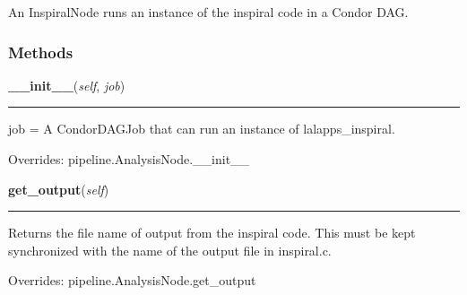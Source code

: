 An InspiralNode runs an instance of the inspiral code in a Condor DAG.



  \subsubsection{Methods}

    \label{inspiral:InspiralNode:__init__}
    \vspace{0.5ex}

    \noindent\begin{boxedminipage}{\textwidth}

    \raggedright \textbf{\_\_init\_\_}(\textit{self}, \textit{job})

    \vspace{-1.5ex}

    \rule{\textwidth}{0.5\fboxrule}
    job = A CondorDAGJob that can run an instance of lalapps\_inspiral.

    \vspace{1ex}

      Overrides: pipeline.AnalysisNode.\_\_init\_\_

    \end{boxedminipage}

    \label{inspiral:InspiralNode:get_output}
    \vspace{0.5ex}

    \noindent\begin{boxedminipage}{\textwidth}

    \raggedright \textbf{get\_output}(\textit{self})

    \vspace{-1.5ex}

    \rule{\textwidth}{0.5\fboxrule}
    Returns the file name of output from the inspiral code. This must be 
    kept synchronized with the name of the output file in inspiral.c.

    \vspace{1ex}

      Overrides: pipeline.AnalysisNode.get\_output

    \end{boxedminipage}

